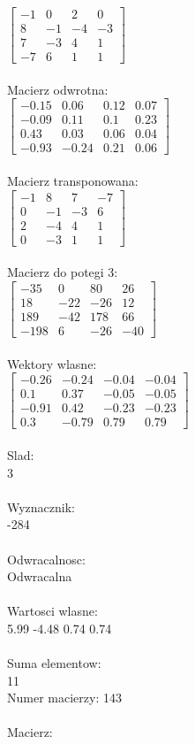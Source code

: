 \documentclass[a4paper,12pt]{article}
\begin{document}
$\begin{bmatrix} -1&0&2&0\\8&-1&-4&-3\\7&-3&4&1\\-7&6&1&1 \end{bmatrix}$
\\
\\
Macierz odwrotna:\\

$\begin{bmatrix} -0.15&0.06&0.12&0.07\\-0.09&0.11&0.1&0.23\\0.43&0.03&0.06&0.04\\-0.93&-0.24&0.21&0.06 \end{bmatrix}$
\\
\\
Macierz transponowana:\\

$\begin{bmatrix} -1&8&7&-7\\0&-1&-3&6\\2&-4&4&1\\0&-3&1&1 \end{bmatrix}$
\\
\\
Macierz do potegi 3:\\

$\begin{bmatrix} -35&0&80&26\\18&-22&-26&12\\189&-42&178&66\\-198&6&-26&-40 \end{bmatrix}$
\\
\\
Wektory wlasne:\\

$\begin{bmatrix} -0.26&-0.24&-0.04&-0.04\\0.1&0.37&-0.05&-0.05\\-0.91&0.42&-0.23&-0.23\\0.3&-0.79&0.79&0.79 \end{bmatrix}$
\\
\\
Slad:\\
3
\\
\\
Wyznacznik:\\
-284
\\
\\
Odwracalnosc:\\
Odwracalna
\\
\\
Wartosci wlasne:\\
5.99 -4.48 0.74 0.74
\\
\\
Suma elementow:\\
11
\\
\newpage
Numer macierzy:
143
\\
\\
Macierz:\\
\end{document}
